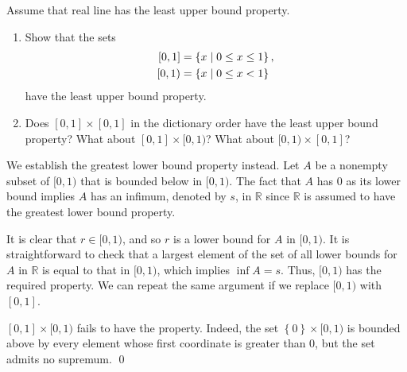 \documentclass[a4paper,12pt]{article}
\begin{document}
\begin{exe}
	Assume that real line has the least upper bound property.
	\begin{enumerate}
		\item
		      Show that the sets
		      \begin{equation*}
			      \begin{split}
				      [0,1] &= \left\{ x \;|\; 0 \le x \le 1 \right\},\\
				      [0,1) &= \left\{ x \;|\; 0 \le x <1 \right\}
			      \end{split}
		      \end{equation*}
		      have the least upper bound property.
		      
		\item
		      Does \( [0,1] \times [0,1] \) in the dictionary order have the least upper bound property?
		      What about \( [0,1] \times [0,1) \)?
		      What about \( [0,1) \times [0,1] \)?
	\end{enumerate}
\end{exe}\begin{sol}\leavevmode \par
	We establish the greatest lower bound property instead.
	Let \( A \) be a nonempty subset of \( [0,1) \) that is bounded below in
	\( [0,1) \).
	The fact that \( A \) has 0 as its lower bound implies
	\( A \)
	has an infimum, denoted by \( s \), in \( \mathbb{R} \)
	since \( \mathbb{R} \) is assumed to have the greatest lower bound property.
	
	It is clear that \( r \in [0,1) \), and so \( r \) is a lower bound for \( A \) in \( [0,1) \).
	It is straightforward to check that a largest element of the set of all lower bounds for
	\( A \) in \( \mathbb{R} \) is equal to that in \( [0,1) \),
	which implies
	\( \inf{A}=s \).
	Thus, \( [0,1) \) has the required property.
	We can repeat the same argument if we replace \( [0,1) \) with \( [0,1] \).
	
	\( [0,1] \times [0,1) \)
	fails to have the property.
	Indeed, the set
	\( \left\{ 0 \right\} \times [0,1) \)
	is bounded above by
	every element whose first coordinate is greater than \( 0 \),
	but the set admits no supremum.
	\qed\end{sol}
\end{document}
